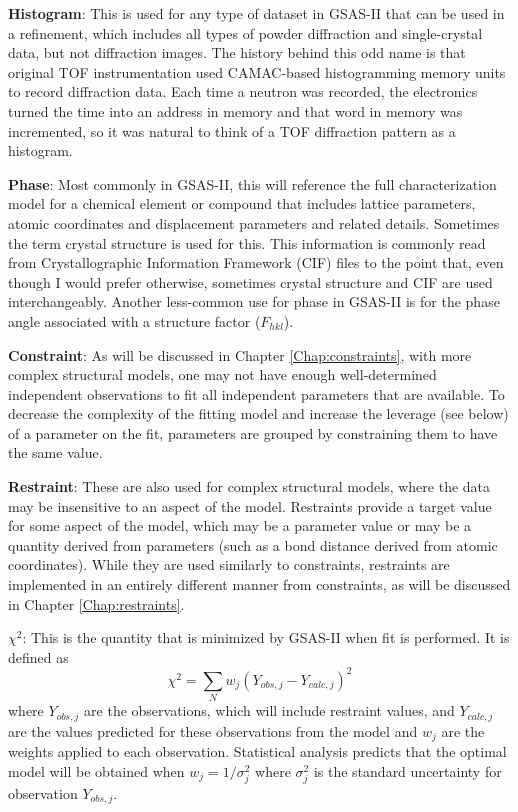 \textbf{Histogram}: This is used for any type of dataset in GSAS-II that can be used in a refinement, which includes all types of powder diffraction and single-crystal data, but not diffraction images. The history behind this odd name is that original TOF instrumentation used CAMAC-based histogramming memory units to record diffraction data. Each time a neutron was recorded, the electronics turned the time into an address in memory and that word in memory was incremented, so it was natural to think of a TOF diffraction pattern as a histogram.  

\textbf{Phase}: Most commonly in GSAS-II, this will reference the full characterization model for a chemical element or compound that includes lattice parameters, atomic coordinates and displacement parameters and related details. Sometimes the term crystal structure is used for this. This information is commonly read from Crystallographic Information Framework (CIF) files to the point that, even though I would prefer otherwise, sometimes crystal structure and CIF are used interchangeably. Another less-common use for phase in GSAS-II is for the phase angle associated with a structure factor ($F_{hkl}$). 

\textbf{Constraint}: As will be discussed in Chapter \ref{Chap:constraints}, with more complex structural models, one may not have enough well-determined independent observations to fit all independent parameters that are available. To decrease the complexity of the fitting model and increase the leverage (see below) of a parameter on the fit, parameters are grouped by constraining them to have the same value. 

\textbf{Restraint}: These are also used for complex structural models, where the data may be insensitive to an aspect of the model. Restraints provide a target value for some aspect of the model, which may be a parameter value or may be a quantity derived from parameters (such as a bond distance derived from atomic coordinates). While they are used similarly to constraints, restraints are implemented in an entirely different manner from constraints, as will be discussed in Chapter \ref{Chap:restraints}.

\textbf{$\chi^2$}:
This is the quantity that is minimized by GSAS-II when fit is performed. It is defined as 
$$\chi^2 = \sum_{N} w_j(Y_{obs,j} - Y_{calc,j})^2$$ 
where $Y_{obs,j}$ are the observations, which will include restraint values, and $Y_{calc,j}$ are the values predicted for these observations from the model and $w_j$ are the weights applied to each observation. Statistical analysis predicts that the optimal model will be obtained when $w_j = 1/\sigma_j^2$ where $\sigma_j^2$ is the standard uncertainty for observation $Y_{obs,j}$.

